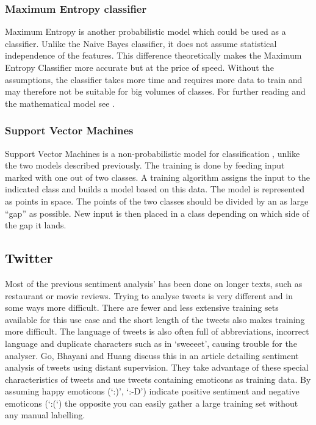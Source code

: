 \documentclass[a4paper]{article}
\begin{document}
\subsubsection{Maximum Entropy classifier}
Maximum Entropy is another probabilistic model which could be used as a classifier. Unlike the Naive Bayes classifier, it does not assume statistical independence of the features. This difference theoretically makes the Maximum Entropy Classifier more accurate but at the price of speed. Without the assumptions, the classifier takes more time and requires more data to train and may therefore not  be suitable for big volumes of classes. For further reading and the mathematical model see \cite{max_ent}.

\subsubsection{Support Vector Machines}
Support Vector Machines is a non-probabilistic model for classification \cite{svm}, unlike the two models described previously. The training is done by feeding input marked with one out of two classes. A training algorithm assigns the input to the indicated class and builds a model based on this data. The model is represented as points in space. The points of the two classes should be divided by an as large “gap” as possible. New input is then placed in a class depending on which side of the gap it lands.

\subsection{Twitter}
Most of the previous sentiment analysis’ has been done on longer texts, such as restaurant or movie reviews. Trying to analyse tweets is very different and in some ways more difficult. There are fewer and less extensive training sets available for this use case and the short length of the tweets also makes training more difficult. The language of tweets is also often full of abbreviations, incorrect language and duplicate characters such as in ‘sweeeet’, causing trouble for the analyser. Go, Bhayani and Huang discuss this in an article \cite{twitter_ds} detailing sentiment analysis of tweets using distant supervision. They take advantage of these special characteristics of tweets and use tweets containing emoticons as training data. By assuming happy emoticons (‘:)’, ‘:-D’) indicate positive sentiment and negative emoticons (‘:(‘) the opposite you can easily gather a large training set without any manual labelling.
\end{document}
